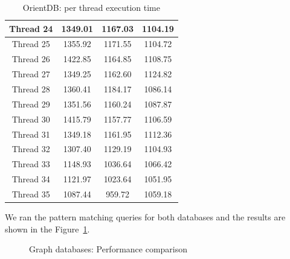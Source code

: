 \begin{table}[h!]
{\begin{minipage}[b]{80mm}
\begin{tabular}{|c|c|c|c|}
 \hline 
Thread	24	&  1349.01  &	1167.03   & 	1104.19  \\ 
 \hline 
Thread	25	&  1355.92  &	1171.55   & 	1104.72  \\ 
 \hline 
Thread	26	&  1422.85  &	1164.85   & 	1108.75  \\ 
 \hline 
Thread	27	&  1349.25  &	1162.60   & 	1124.82  \\ 
 \hline 
Thread	28	&  1360.41  &	1184.17   & 	1086.14  \\ 
 \hline 
Thread	29	&  1351.56  &	1160.24   & 	1087.87  \\ 
 \hline 
Thread	30	&  1415.79  &	1157.77   & 	1106.59  \\ 
 \hline 
Thread	31	&  1349.18  &	1161.95   & 	1112.36  \\ 
 \hline 
Thread	32	&  1307.40  &	1129.19   & 	1104.93  \\ 
 \hline 
Thread	33	&  1148.93  &	1036.64   & 	1066.42  \\ 
 \hline 
Thread	34	&  1121.97  &	1023.64   & 	1051.95  \\ 
 \hline 
Thread	35	&  1087.44  &	959.72    & 	1059.18  \\ 
 \hline
\end{tabular}
\caption{OrientDB: per thread execution time}
\label{table:orient}
\end{minipage}
}%
\label{table:orientdb-per thread}
\end{table}




We ran the pattern matching queries for both databases and the results are shown in the Figure~\ref{fig:comparsion}.

\begin{figure}[h!]
	\centering
	\caption{Graph databases: Performance comparison}
	\label{fig:comparsion}
	\centering
\end{figure}

